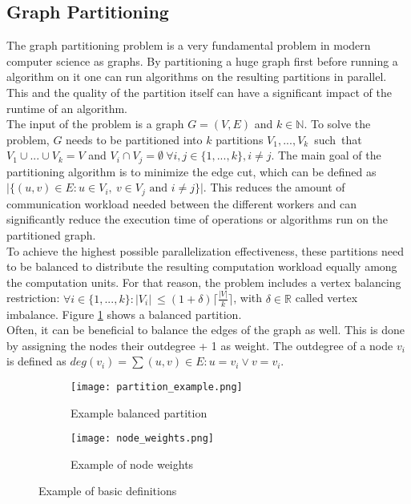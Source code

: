 \documentclass[acmsmall,nonacm,screen,review]{acmart}
\begin{document}
\subsection{Graph Partitioning}
The graph partitioning problem is a very fundamental problem in modern computer science as graphs. By partitioning a huge graph first before running a algorithm on it one can run algorithms on the resulting partitions in parallel. This and the quality of the partition itself can have a significant impact of the runtime of an algorithm. \\ 
The input of the problem is a graph $G = (V,E)$ and $k\in \mathbb{N}$. To solve the problem, $G$ needs to be partitioned into $k$ partitions \hbox{$V_{1},...,V_{k}$ such that $V_{1}\cup...\cup V_{k} = V$} and $V_{i}\cap V_{j} = \emptyset\ \forall i,j\in \{1,...,k\}, i \neq j$. The main goal of the partitioning algorithm is to minimize the edge cut, which can be defined as $\vert \{(u,v)\in E : u\in V_{i},\ v\in V_{j} \text{ and } i\neq j \}\vert$. This reduces the amount of communication workload needed between the different workers and can significantly reduce the execution time of operations or algorithms run on the partitioned graph.  \\
To achieve the highest possible parallelization effectiveness, these partitions need to be balanced to distribute the resulting computation workload equally among the computation units. For that reason, the problem includes a vertex balancing restriction: $\forall i\in \{1,...,k\} : \vert V_{i}\vert \ \leq (1 + \delta) \lceil \frac{\vert V \vert }{k} \rceil $, with $\delta \in \mathbb{R}$ called vertex imbalance. Figure \ref{partition} shows a balanced partition. \\
Often, it can be beneficial to balance the edges of the graph as well. This is done by assigning the nodes their outdegree + 1 as weight. The outdegree of a node $v_{i}$ is defined as $deg(v_{i}) = \sum{(u,v)\in E : u = v_{i} \vee v = v_{i}}$.
\begin{figure}[bt!]
     \centering
     \begin{subfigure}[b]{0.45\textwidth}
         \centering
         \texttt{[image: partition\_example.png]}
         \caption{Example balanced partition}
         \label{partition}
     \end{subfigure}
     \hfill
     \begin{subfigure}[b]{0.45\textwidth}
         \centering
         \texttt{[image: node\_weights.png]}
         \caption{Example of node weights}
         \label{weights}
     \end{subfigure}
     \caption{Example of basic definitions}
     \label{combi}
\end{figure}
\end{document}
